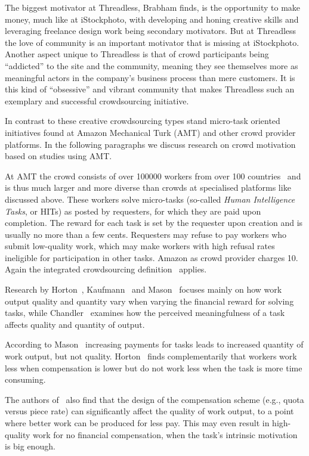 \documentclass{sig-alternate}
\begin{document}
The biggest motivator at Threadless, Brabham finds, is the opportunity to make
money, much like at iStockphoto, with developing and honing creative skills and
leveraging freelance design work being secondary motivators. But at Threadless
the love of community is an important motivator that is missing at iStockphoto.
Another aspect unique to Threadless is that of crowd participants being
``addicted'' to the site and the community, meaning they see themselves more
as meaningful actors in the company's business process than mere customers. It
is this kind of ``obsessive'' and vibrant community that makes Threadless such
an exemplary and successful crowdsourcing initiative.

In contrast to these creative crowdsourcing types stand micro-task oriented
initiatives found at Amazon Mechanical Turk (AMT) and other crowd provider
platforms. In the following paragraphs we discuss research on crowd motivation
based on studies using AMT.

At AMT the crowd consists of over \num{100000} workers from over \num{100}
countries~\cite{buhrmester2011amazon} and is thus much larger and more diverse
than crowds at specialised platforms like discussed above. These workers solve
micro-tasks (so-called \emph{Human Intelligence Tasks}, or HITs) as posted by
requesters, for which they are paid upon completion.  The reward for each task
is set by the requester upon creation and is usually no more than a few cents.
Requesters may refuse to pay workers who submit low-quality work, which may
make workers with high refusal rates ineligible for participation in other
tasks. Amazon as crowd provider charges \num{10}\percent. Again the integrated
crowdsourcing definition~\cite{estelles2012towards} applies.

Research by Horton~\cite{horton2010labor}, Kaufmann~\cite{kaufmann2011more} and
Mason~\cite{mason2010financial} focuses mainly on how work output quality and quantity
vary when varying the financial reward for solving tasks,
while Chandler~\cite{chandler2013breaking} examines how the perceived
meaningfulness of a task affects quality and quantity of output.

According to Mason~\cite{mason2010financial} increasing payments for tasks
leads to increased quantity of work output, but not quality.
Horton~\cite{horton2010labor} finds complementarily that workers work less when
compensation is lower but do not work less when the task is more time
consuming. 

The authors of~\cite{mason2010financial} also find that the design of the
compensation scheme (e.g., quota versus piece rate) can significantly affect
the quality of work output, to a point where better work can be produced for
less pay. This may even result in high-quality work for no financial
compensation, when the task's intrinsic motivation is big enough.
\end{document}
